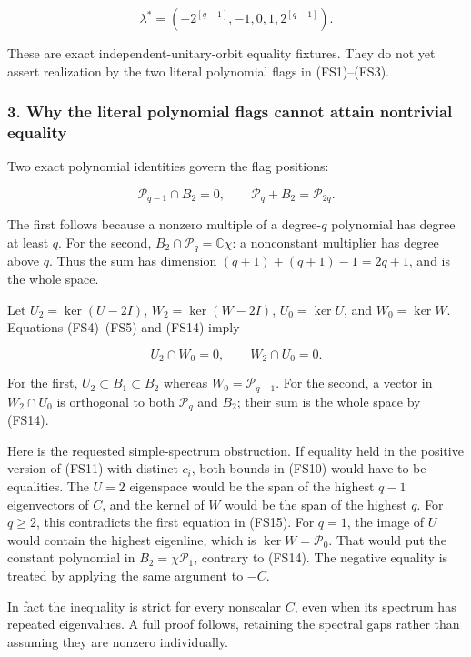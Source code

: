 \[
\lambda^*=(-2^{[q-1]},-1,0,1,2^{[q-1]}).
\tag{FS13}
\]

These are exact independent-unitary-orbit equality fixtures. They do not yet assert realization by the two literal polynomial flags in (FS1)--(FS3).

\subsubsection{3. Why the literal polynomial flags cannot attain nontrivial equality}\label{endpoint-four_window_sharpness--why-the-literal-polynomial-flags-cannot-attain-nontrivial-equality}

Two exact polynomial identities govern the flag positions:

\[
\mathcal P_{q-1}\cap B_2=0,
\qquad \mathcal P_q+B_2=\mathcal P_{2q}.
\tag{FS14}
\]

The first follows because a nonzero multiple of a degree-\(q\) polynomial has degree at least \(q\). For the second, \(B_2\cap\mathcal P_q=\mathbb C\chi\): a nonconstant multiplier has degree above \(q\). Thus the sum has dimension \((q+1)+(q+1)-1=2q+1\), and is the whole space.

Let \(U_2=\ker(U-2I)\), \(W_2=\ker(W-2I)\), \(U_0=\ker U\), and \(W_0=\ker W\). Equations (FS4)--(FS5) and (FS14) imply

\[
U_2\cap W_0=0,
\qquad W_2\cap U_0=0.
\tag{FS15}
\]

For the first, \(U_2\subset B_1\subset B_2\) whereas \(W_0=\mathcal P_{q-1}\). For the second, a vector in \(W_2\cap U_0\) is orthogonal to both \(\mathcal P_q\) and \(B_2\); their sum is the whole space by (FS14).

Here is the requested simple-spectrum obstruction. If equality held in the positive version of (FS11) with distinct \(c_i\), both bounds in (FS10) would have to be equalities. The \(U=2\) eigenspace would be the span of the highest \(q-1\) eigenvectors of \(C\), and the kernel of \(W\) would be the span of the highest \(q\). For \(q\ge2\), this contradicts the first equation in (FS15). For \(q=1\), the image of \(U\) would contain the highest eigenline, which is \(\ker W=\mathcal P_0\). That would put the constant polynomial in \(B_2=\chi\mathcal P_1\), contrary to (FS14). The negative equality is treated by applying the same argument to \(-C\).

In fact the inequality is strict for every nonscalar \(C\), even when its spectrum has repeated eigenvalues. A full proof follows, retaining the spectral gaps rather than assuming they are nonzero individually.

